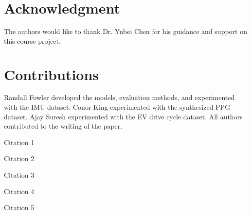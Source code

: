 \documentclass[conference]{IEEEtran}
\begin{document}
\section*{Acknowledgment}
The authors would like to thank Dr. Yubei Chen for his guidance and support on this course project.

\section*{Contributions}
Randall Fowler developed the models, evaluation methods, and experimented with the IMU dataset. Conor King experimented with the synthesized PPG dataset. Ajay Suresh experimented with the EV drive cycle dataset. All authors contributed to the writing of the paper.

\begin{thebibliography}{1}


Citation 1

Citation 2

Citation 3

Citation 4

Citation 5

\end{thebibliography}
\end{document}
